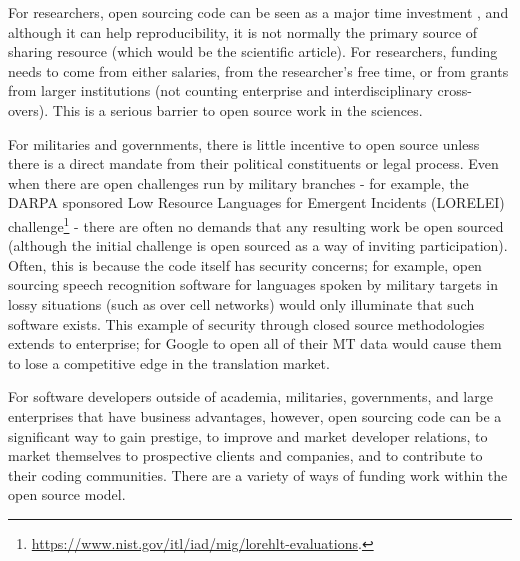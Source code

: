 For researchers, open sourcing code can be seen as a major time investment \citep{fitzjohn2014reproducible, lowndes2017our}, and although it can help reproducibility, it is not normally the primary source of sharing resource (which would be the scientific article). For researchers, funding needs to come from either salaries, from the researcher's free time, or from grants from larger institutions (not counting enterprise and interdisciplinary cross-overs). This is a serious barrier to open source work in the sciences.

For militaries and governments, there is little incentive to open source unless there is a direct mandate from their political constituents or legal process. Even when there are open challenges run by military branches - for example, the DARPA sponsored Low Resource Languages for Emergent Incidents (LORELEI) challenge\footnote{\href{https://www.nist.gov/itl/iad/mig/lorehlt-evaluations}{https://www.nist.gov/itl/iad/mig/lorehlt-evaluations}. } - there are often no demands that any resulting work be open sourced (although the initial challenge is open sourced as a way of inviting participation). Often, this is because the code itself has security concerns; for example, open sourcing speech recognition software for languages spoken by military targets in lossy situations (such as over cell networks) would only illuminate that such software exists. This example of security through closed source methodologies extends to enterprise; for Google to open all of their MT data would cause them to lose a competitive edge in the translation market.

For software developers outside of academia, militaries, governments, and large enterprises that have business advantages, however, open sourcing code can be a significant way to gain prestige, to improve and market developer relations, to market themselves to prospective clients and companies, and to contribute to their coding communities. There are a variety of ways of funding work within the open source model.

